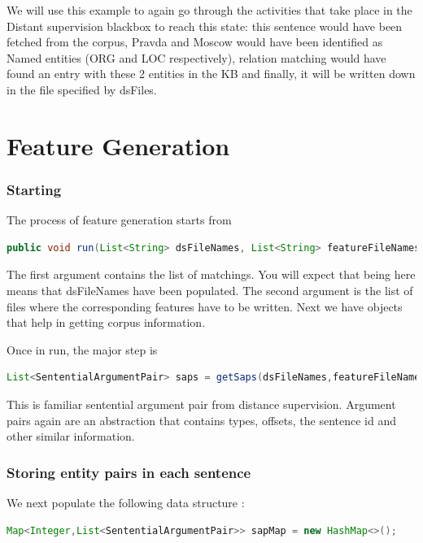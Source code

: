 \documentclass[a4paper,10pt]{report}
\begin{document}
We will use this example to again go through the activities that take place in the  Distant supervision blackbox to reach this state: this sentence would have been fetched from the 
corpus, Pravda and Moscow would have been identified as Named entities (ORG and LOC respectively), relation matching would have found an entry with these 2 entities
in the KB and finally, it will be written down in the file specified by dsFiles.



\chapter{Feature Generation}

\subsection{Starting}
The process of feature generation starts from 
\begin{lstlisting}[language=java]
public void run(List<String> dsFileNames, List<String> featureFileNames, Corpus c, CorpusInformationSpecification cis)
\end{lstlisting}

The first argument contains the list of matchings. You will expect that being here means that dsFileNames have been populated. 
The second argument is the list of files where the corresponding features have to be written.
Next we have objects that help in getting corpus information.

Once in run, the major step is 

\begin{lstlisting}[language=java]
List<SententialArgumentPair> saps = getSaps(dsFileNames,featureFileNames);
\end{lstlisting}
This is familiar sentential argument pair from distance supervision. Argument pairs again are an abstraction that 
contains types, offsets, the sentence id and other similar information. 

\subsection{Storing entity pairs in each sentence}
We next populate the following data structure : 

\begin{lstlisting}[language=java]
Map<Integer,List<SententialArgumentPair>> sapMap = new HashMap<>();
\end{lstlisting}
\end{document}
